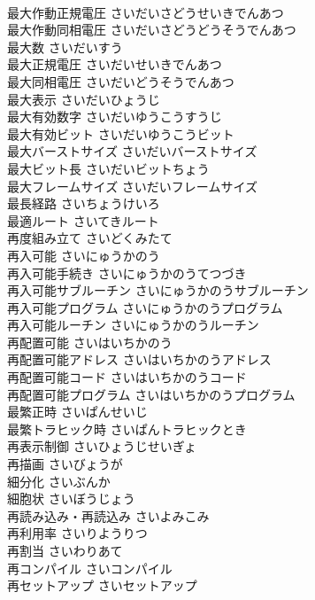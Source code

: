 \documentclass[8pt]{extreport}
\begin{document}
\begin{CJK}{UTF8}{min}
\\	最大作動正規電圧	さいだいさどうせいきでんあつ	
\\	最大作動同相電圧	さいだいさどうどうそうでんあつ	
\\	最大数	さいだいすう	
\\	最大正規電圧	さいだいせいきでんあつ	
\\	最大同相電圧	さいだいどうそうでんあつ	
\\	最大表示	さいだいひょうじ	
\\	最大有効数字	さいだいゆうこうすうじ	
\\	最大有効ビット	さいだいゆうこうビット	
\\	最大バーストサイズ	さいだいバーストサイズ	
\\	最大ビット長	さいだいビットちょう	
\\	最大フレームサイズ	さいだいフレームサイズ	
\\	最長経路	さいちょうけいろ	
\\	最適ルート	さいてきルート	
\\	再度組み立て	さいどくみたて	
\\	再入可能	さいにゅうかのう	
\\	再入可能手続き	さいにゅうかのうてつづき	
\\	再入可能サブルーチン	さいにゅうかのうサブルーチン	
\\	再入可能プログラム	さいにゅうかのうプログラム	
\\	再入可能ルーチン	さいにゅうかのうルーチン	
\\	再配置可能	さいはいちかのう	
\\	再配置可能アドレス	さいはいちかのうアドレス	
\\	再配置可能コード	さいはいちかのうコード	
\\	再配置可能プログラム	さいはいちかのうプログラム	
\\	最繁正時	さいぱんせいじ	
\\	最繁トラヒック時	さいぱんトラヒックとき	
\\	再表示制御	さいひょうじせいぎょ	
\\	再描画	さいびょうが	
\\	細分化	さいぶんか	
\\	細胞状	さいぼうじょう	
\\	再読み込み・再読込み	さいよみこみ	
\\	再利用率	さいりようりつ	
\\	再割当	さいわりあて	
\\	再コンパイル	さいコンパイル	
\\	再セットアップ	さいセットアップ	

\end{CJK}
\end{document}
